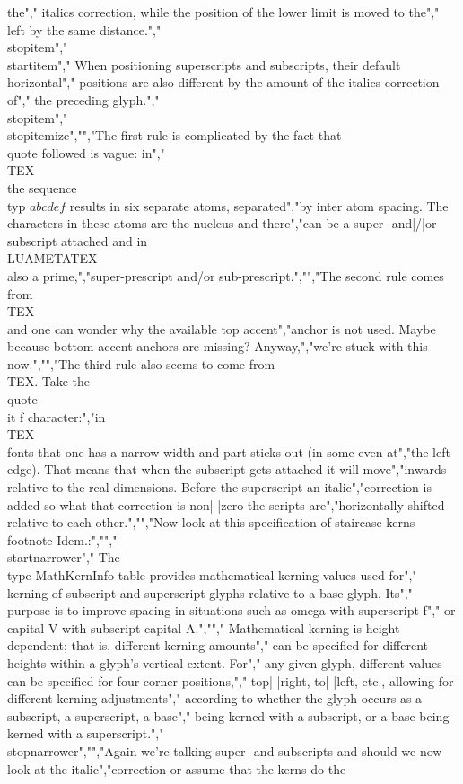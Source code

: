 the","        italics correction, while the position of the lower limit is moved to the","        left by the same distance.","    \\stopitem","    \\startitem","        When positioning superscripts and subscripts, their default horizontal","        positions are also different by the amount of the italics correction of","        the preceding glyph.","    \\stopitem","\\stopitemize","","The first rule is complicated by the fact that \\quote {followed} is vague: in","\\TEX\\ the sequence \\typ {$ a b c def $} results in six separate atoms, separated","by inter atom spacing. The characters in these atoms are the nucleus and there","can be a super- and|/|or subscript attached and in \\LUAMETATEX\\ also a prime,","super-prescript and/or sub-prescript.","","The second rule comes from \\TEX\\ and one can wonder why the available top accent","anchor is not used. Maybe because bottom accent anchors are missing? Anyway,","we're stuck with this now.","","The third rule also seems to come from \\TEX. Take the \\quote {\\it f} character:","in \\TEX\\ fonts that one has a narrow width and part sticks out (in some even at","the left edge). That means that when the subscript gets attached it will move","inwards relative to the real dimensions. Before the superscript an italic","correction is added so what that correction is non|-|zero the scripts are","horizontally shifted relative to each other.","","Now look at this specification of staircase kerns \\footnote {Idem.}:","","\\startnarrower","    The \\type {MathKernInfo} table provides mathematical kerning values used for","    kerning of subscript and superscript glyphs relative to a base glyph. Its","    purpose is to improve spacing in situations such as omega with superscript f","    or capital V with subscript capital A.","","    Mathematical kerning is height dependent; that is, different kerning amounts","    can be specified for different heights within a glyph’s vertical extent. For","    any given glyph, different values can be specified for four corner positions,","    top|-|right, to|-|left, etc., allowing for different kerning adjustments","    according to whether the glyph occurs as a subscript, a superscript, a base","    being kerned with a subscript, or a base being kerned with a superscript.","\\stopnarrower","","Again we're talking super- and subscripts and should we now look at the italic","correction or assume that the kerns do the 